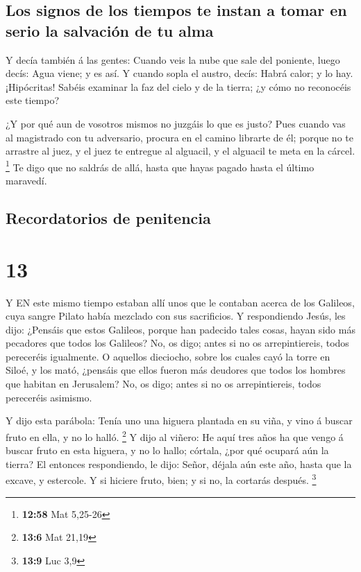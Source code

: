 \hypertarget{los-signos-de-los-tiempos-te-instan-a-tomar-en-serio-la-salvaciuxf3n-de-tu-alma}{%
\subsection{Los signos de los tiempos te instan a tomar en serio la
salvación de tu
alma}\label{los-signos-de-los-tiempos-te-instan-a-tomar-en-serio-la-salvaciuxf3n-de-tu-alma}}

 Y decía también á las gentes: Cuando veis la nube que sale
del poniente, luego decís: Agua viene; y es así.  Y cuando
sopla el austro, decís: Habrá calor; y lo hay. 
¡Hipócritas! Sabéis examinar la faz del cielo y de la tierra; ¿y cómo no
reconocéis este tiempo?

 ¿Y por qué aun de vosotros mismos no juzgáis lo que es
justo?  Pues cuando vas al magistrado con tu adversario,
procura en el camino librarte de él; porque no te arrastre al juez, y el
juez te entregue al alguacil, y el alguacil te meta en la cárcel.
\footnote{\textbf{12:58} Mat 5,25-26}  Te digo que no
saldrás de allá, hasta que hayas pagado hasta el último maravedí.

\hypertarget{recordatorios-de-penitencia}{%
\subsection{Recordatorios de
penitencia}\label{recordatorios-de-penitencia}}

\hypertarget{section-12}{%
\section{13}\label{section-12}}

 Y EN este mismo tiempo estaban allí unos que le contaban
acerca de los Galileos, cuya sangre Pilato había mezclado con sus
sacrificios.  Y respondiendo Jesús, les dijo: ¿Pensáis que
estos Galileos, porque han padecido tales cosas, hayan sido más
pecadores que todos los Galileos?  No, os digo; antes si no
os arrepintiereis, todos pereceréis igualmente.  O aquellos
dieciocho, sobre los cuales cayó la torre en Siloé, y los mató, ¿pensáis
que ellos fueron más deudores que todos los hombres que habitan en
Jerusalem?  No, os digo; antes si no os arrepintiereis,
todos pereceréis asimismo.

 Y dijo esta parábola: Tenía uno una higuera plantada en su
viña, y vino á buscar fruto en ella, y no lo halló. \footnote{\textbf{13:6}
  Mat 21,19}  Y dijo al viñero: He aquí tres años ha que
vengo á buscar fruto en esta higuera, y no lo hallo; córtala, ¿por qué
ocupará aún la tierra?  El entonces respondiendo, le dijo:
Señor, déjala aún este año, hasta que la excave, y estercole.
 Y si hiciere fruto, bien; y si no, la cortarás después.
\footnote{\textbf{13:9} Luc 3,9}

